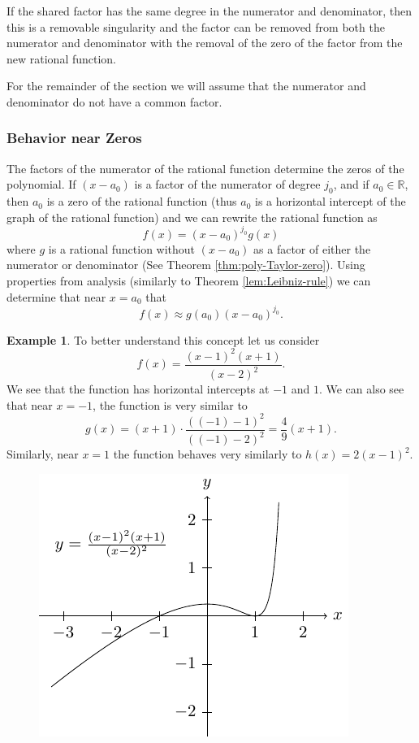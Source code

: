 \documentclass[
]{book}
\theoremstyle{definition}
\theoremstyle{definition}
\newtheorem{example}{Example}[chapter]
\theoremstyle{definition}
\theoremstyle{definition}
\theoremstyle{remark}
\begin{document}
If the shared factor has the same degree in the numerator and denominator, then this is a removable singularity and the factor can be removed from both the numerator and denominator with the removal of the zero of the factor from the new rational function.

For the remainder of the section we will assume that the numerator and denominator do not have a common factor.

\hypertarget{behavior-near-zeros}{%
\subsubsection{Behavior near Zeros}\label{behavior-near-zeros}}

The factors of the numerator of the rational function determine the zeros of the polynomial. If \((x-a_0)\) is a factor of the numerator of degree \(j_0\), and if \(a_0\in \mathbb{R}\), then \(a_0\) is a zero of the rational function (thus \(a_0\) is a horizontal intercept of the graph of the rational function) and we can rewrite the rational function as
\[f(x) = (x-a_0)^{j_0} g(x)\] where \(g\) is a rational function without \((x-a_0)\) as a factor of either the numerator or denominator (See Theorem \ref{thm:poly-Taylor-zero}). Using properties from analysis (similarly to Theorem \ref{lem:Leibniz-rule}) we can determine that near \(x=a_0\) that
\[f(x) \approx g(a_0) (x-a_0)^{j_0}.\]

\begin{example}

To better understand this concept let us consider \[f(x)=\frac{(x-1)^2(x+1)}{(x-2)^2}.\]
We see that the function has horizontal intercepts at \(-1\) and \(1\). We can also see that near \(x=-1\), the function is very similar to \[g(x)= (x+1) \cdot \frac{ ((-1)-1)^2}{((-1)-2)^2}= \frac{4}{9} (x+1).\] Similarly, near \(x=1\) the function behaves very similarly to \(h(x)= 2(x-1)^2\).

\begin{figure}

{\centering \includegraphics[width=0.5\linewidth]{tikz/rational1} 

}

\end{figure}

\end{example}
\end{document}
